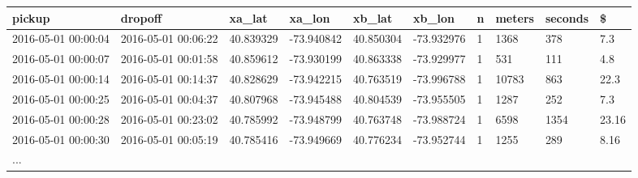 \begin{tabular}{llllllllll}
\toprule
             pickup &             dropoff &     xa\_lat &     xa\_lon &     xb\_lat &     xb\_lon & n & meters & seconds &      \$ \\
\midrule
2016-05-01 00:00:04 & 2016-05-01 00:06:22 &  40.839329 & -73.940842 &  40.850304 & -73.932976 & 1 &   1368 &     378 &    7.3 \\
2016-05-01 00:00:07 & 2016-05-01 00:01:58 &  40.859612 & -73.930199 &  40.863338 & -73.929977 & 1 &    531 &     111 &    4.8 \\
2016-05-01 00:00:14 & 2016-05-01 00:14:37 &  40.828629 & -73.942215 &  40.763519 & -73.996788 & 1 &  10783 &     863 &   22.3 \\
2016-05-01 00:00:25 & 2016-05-01 00:04:37 &  40.807968 & -73.945488 &  40.804539 & -73.955505 & 1 &   1287 &     252 &    7.3 \\
2016-05-01 00:00:28 & 2016-05-01 00:23:02 &  40.785992 & -73.948799 &  40.763748 & -73.988724 & 1 &   6598 &    1354 &  23.16 \\
2016-05-01 00:00:30 & 2016-05-01 00:05:19 &  40.785416 & -73.949669 &  40.776234 & -73.952744 & 1 &   1255 &     289 &   8.16 \\
                ... &                     &            &            &            &            &   &        &         &        \\
\bottomrule
\end{tabular}

